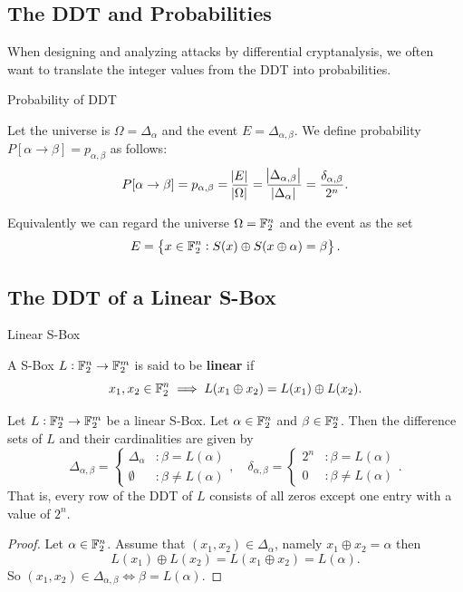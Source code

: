 \documentclass[11pt,openany]{article}
\begin{document}
\newpage
\subsection{The DDT and Probabilities}
When designing and analyzing attacks by differential cryptanalysis, we often want to translate the integer values from the DDT into probabilities.

\begin{defbox}{Probability of DDT}
\begin{definition}
	Let the universe is $\Omega=\Delta_\alpha$ and the event $E=\Delta_{\alpha,\beta}$. We define probability $P[\alpha\to\beta]=p_{\alpha,\beta}$ as follows: \[
	P[\alpha\to\beta]=p_{\alpha,\beta}=\frac{\abs{E}}{\abs{\Omega}}=\frac{\abs{\Delta_{\alpha,\beta}}}{\abs{\Delta_\alpha}}=\frac{\delta_{\alpha,\beta}}{2^n}.
	\]
\end{definition}
\end{defbox}

\begin{remark}
	Equivalently we can regard the universe $\Omega=\mathbb{F}_2^n$ and the event as the set \[
	E=\set{x\in\mathbb{F}_2^n:S(x)\oplus S(x\oplus\alpha)=\beta}.
	\]
\end{remark}

\subsection{The DDT of a Linear S-Box}
\begin{defbox}{Linear S-Box}
\begin{definition}
A S-Box $L:\mathbb{F}_2^n\to\mathbb{F}_2^m$ is said to be \textbf{linear} if \[
x_1,x_2\in\mathbb{F}_2^n\implies L(x_1\oplus x_2)=L(x_1)\oplus L(x_2).
\]
\end{definition}
\end{defbox}
\vspace{12pt}
\begin{probox}{}
\begin{proposition}
Let $L:\mathbb{F}_2^n\to\mathbb{F}_2^m$ be a linear S-Box. Let $\alpha\in\mathbb{F}_2^n$ and $\beta\in\mathbb{F}_2^n$. Then the difference sets of $L$ and their cardinalities are given by \[
\Delta_{\alpha,\beta}=\begin{cases}
\Delta_\alpha &:\beta=L(\alpha)\\
\emptyset &:\beta\neq L(\alpha)
\end{cases},\quad \delta_{\alpha,\beta}=\begin{cases}
2^n &:\beta=L(\alpha)\\
0 &:\beta\neq L(\alpha)
\end{cases}.
\] That is, every row of the DDT of $L$ consists of all zeros except one entry with a value of $2^n$.
\end{proposition}
\end{probox}
\begin{proof}
	Let $\alpha\in\mathbb{F}_2^n$. Assume that $(x_1,x_2)\in\Delta_{\alpha}$, namely $x_1\oplus x_2=\alpha$ then \[
	L(x_1)\oplus L(x_2)=L(x_1\oplus x_2)=L(\alpha).
	\] So $(x_1,x_2)\in\Delta_{\alpha,\beta}\iff\beta=L(\alpha)$.
\end{proof}
\end{document}
